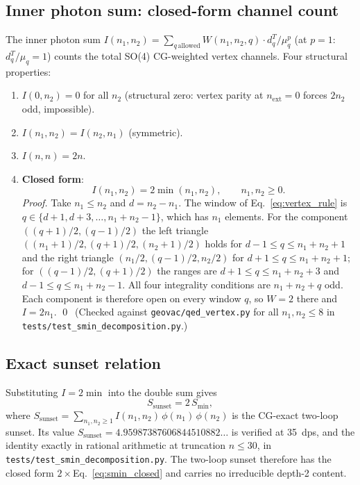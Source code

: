 \documentclass[11pt]{article}
\begin{document}
\subsection{Inner photon sum: closed-form channel count}
\label{subsec:smin_channel}

The inner photon sum $I(n_1, n_2) = \sum_{q\,\mathrm{allowed}}
W(n_1, n_2, q) \cdot d_q^T / \mu_q^p$ (at $p=1$: $d_q^T/\mu_q = 1$)
counts the total SO(4) CG-weighted vertex channels.  Four structural
properties:
\begin{enumerate}
\item[(i)] $I(0, n_2) = 0$ for all $n_2$ (structural zero: vertex parity
  at $n_{\mathrm{ext}}=0$ forces $2n_2$ odd, impossible).
\item[(ii)] $I(n_1, n_2) = I(n_2, n_1)$ (symmetric).
\item[(iii)] $I(n, n) = 2n$.
\item[(iv)] \textbf{Closed form}:
  \begin{equation}
    I(n_1, n_2) = 2\min(n_1, n_2), \qquad n_1, n_2 \ge 0.
    \label{eq:channel_closed_form}
  \end{equation}
  \emph{Proof.}  Take $n_1 \le n_2$ and $d = n_2 - n_1$.  The window
  of Eq.~\eqref{eq:vertex_rule} is $q \in \{d+1, d+3, \ldots,
  n_1 + n_2 - 1\}$, which has $n_1$ elements.  For the component
  $((q+1)/2, (q-1)/2)$ the left triangle
  $((n_1+1)/2, (q+1)/2, (n_2+1)/2)$ holds for $d-1 \le q \le n_1+n_2+1$
  and the right triangle $(n_1/2, (q-1)/2, n_2/2)$ for
  $d+1 \le q \le n_1+n_2+1$; for $((q-1)/2, (q+1)/2)$ the ranges are
  $d+1 \le q \le n_1+n_2+3$ and $d-1 \le q \le n_1+n_2-1$.  All four
  integrality conditions are $n_1 + n_2 + q$ odd.  Each component is
  therefore open on every window $q$, so $W = 2$ there and
  $I = 2n_1$.  \qed\ (Checked against \texttt{geovac/qed\_vertex.py}
  for all $n_1, n_2 \le 8$ in \texttt{tests/test\_smin\_decomposition.py}.)
\end{enumerate}

\subsection{Exact sunset relation}
\label{subsec:smin_sunset}

Substituting $I = 2\min$ into the double sum gives
\begin{equation}
  S_{\mathrm{sunset}} = 2\,S_{\min},
  \label{eq:sunset_relation}
\end{equation}
where $S_{\mathrm{sunset}} = \sum_{n_1,n_2 \ge 1} I(n_1,n_2)\,\phi(n_1)\,\phi(n_2)$
is the CG-exact two-loop sunset.  Its value
$S_{\mathrm{sunset}} = 4.95987387606844510882\ldots$ is verified at
35~dps, and the identity exactly in rational arithmetic at truncation
$n \le 30$, in \texttt{tests/test\_smin\_decomposition.py}.  The two-loop
sunset therefore has the closed form $2\times$Eq.~\eqref{eq:smin_closed}
and carries no irreducible depth-2 content.
\end{document}
